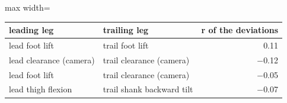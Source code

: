 \begin{adjustbox}{max width=\textwidth}
{\footnotesize
\begin{tabular}{llr}
\toprule
\textbf{leading leg} & \textbf{trailing leg} & \textbf{r of the deviations} \\
\midrule
lead foot lift & trail foot lift & 0.11 \\
lead clearance (camera) & trail clearance (camera) & $-$0.12 \\
lead foot lift & trail clearance (camera) & $-$0.05 \\
lead thigh flexion & trail shank backward tilt & $-$0.07 \\
\bottomrule
\end{tabular}
}
\end{adjustbox}
